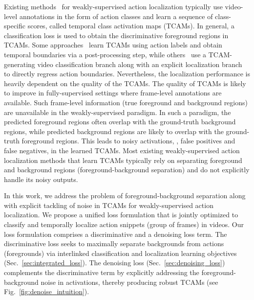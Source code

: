 \documentclass[10pt,twocolumn,letterpaper]{article}
\begin{document}
Existing methods~\cite{hideseek,untrimnets,stpn,wtalc,autoloc} for weakly-supervised action localization typically use video-level annotations in the form of action classes and learn a sequence of class-specific scores, called temporal class activation maps (TCAMs). In general, a classification loss is used to obtain the discriminative foreground regions in TCAMs.
Some approaches~\cite{stpn,wtalc,3cnet,bg-modeling} learn TCAMs using action labels and obtain temporal boundaries via a post-processing step, while others~\cite{autoloc,cleannet} use a TCAM-generating video classification branch along with an explicit localization branch to directly regress action boundaries. 
Nevertheless, the localization performance is heavily dependent on the quality of the TCAMs. 
The quality of TCAMs is likely to improve in fully-supervised settings where frame-level annotations are available. 
Such frame-level information (true foreground and background regions) are unavailable in the weakly-supervised paradigm. In such a paradigm, the predicted foreground regions often overlap with the ground-truth background regions, while predicted background regions are likely to overlap with the ground-truth foreground regions. 
This leads to noisy activations, \ie, false positives and false negatives, in the learned TCAMs. Most existing weakly-supervised action localization methods that learn TCAMs typically rely on separating foreground and background regions (foreground-background separation) and do not explicitly handle its noisy outputs.




In this work, we address the problem of foreground-background separation along with explicit tackling of noise in TCAMs for weakly-supervised action localization. 
We propose a unified loss formulation that is jointly optimized to classify and temporally localize action snippets (group of frames) in videos. 
Our loss formulation comprises a discriminative and a denoising loss term.
The discriminative loss seeks to maximally separate backgrounds from actions (foregrounds) via interlinked classification and localization learning objectives (Sec.~\ref{sec:integrated_loss}). 
The denoising loss (Sec.~\ref{sec:denoising_loss}) complements the discriminative term by explicitly addressing the foreground-background noise in activations, thereby producing robust TCAMs (see Fig.~\ref{fig:denoise_intuition}).
\end{document}
